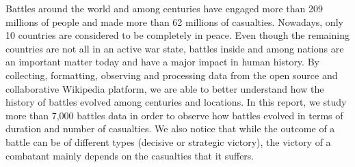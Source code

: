 Battles around the world and among centuries have engaged more than 209 millions of people and made more than 62 millions of casualties. Nowadays, only 10 countries are considered to be completely in peace. Even though the remaining countries are not all in an active war state, battles inside and among nations are an important matter today and have a major impact in human history. By collecting, formatting, observing and processing data from the open source and collaborative Wikipedia platform, we are able to better understand how the history of battles evolved among centuries and locations. In this report, we study more than 7,000 battles data in order to observe how battles evolved in terms of duration and number of casualties. We also notice that while the outcome of a battle can be of different types (decisive or strategic victory), the victory of a combatant mainly depends on the casualties that it suffers.